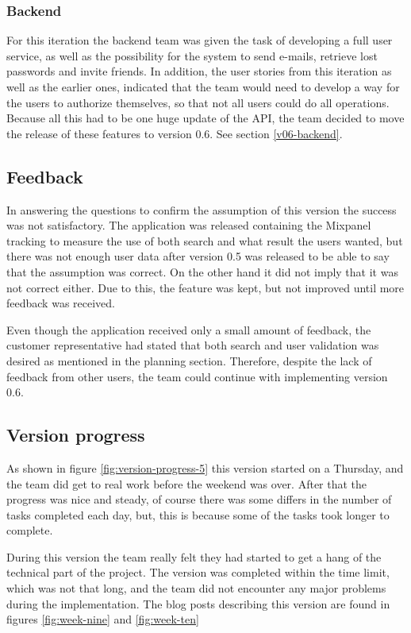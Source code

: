 \subsubsection{Backend}
For this iteration the \gls{backend} team was given the task of developing a full user service, as well as the possibility for the system to send e-mails, retrieve lost passwords and invite friends. In addition, the user stories from this iteration as well as the earlier ones, indicated that the team would need to develop a way for the users to authorize themselves, so that not all users could do all operations. Because all this had to be one huge update of the \gls{API}, the team decided to move the release of these features to version 0.6. See section \ref{v06-backend}.


\subsection{Feedback}
In answering the questions to confirm the assumption of this version the success was not satisfactory. The application was released containing the Mixpanel tracking to measure the use of both search and what result the users wanted, but there was not enough user data after version 0.5 was released to be able to say that the assumption was correct. On the other hand it did not imply that it was not correct either. Due to this, the feature was kept, but not improved until more feedback was received.

Even though the application received only a small amount of feedback, the customer representative had stated that both search and user validation was desired as mentioned in the planning section. Therefore, despite the lack of feedback from other users, the team could continue with implementing version 0.6.

\subsection{Version progress}
As shown in figure \ref{fig:version-progress-5} this version started on a Thursday, and the team did get to real work before the weekend was over. After that the progress was nice and steady, of course there was some differs in the number of tasks completed each day, but, this is because some of the tasks took longer to complete.

During this version the team really felt they had started to get a hang of the technical part of the project. The version was completed within the time limit, which was not that long, and the team did not encounter any major problems during the implementation. The blog posts describing this version are found in figures \ref{fig:week-nine} and \ref{fig:week-ten}

